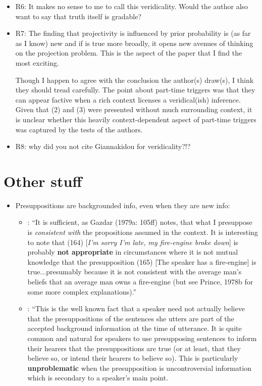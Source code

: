 \documentclass[11pt,fleqn]{article}
\newcommand{\6}{\mbox{$[\hspace*{-.6mm}[$}}
\newcommand{\9}{\mbox{$]\hspace*{-.6mm}]$}}
\begin{document}
{\begin{itemize}
\item R6:  It makes no sense to me to call this veridicality.  Would the author also want to say that truth itself is gradable? 

\item R7: The finding that projectivity is influenced by prior probability is (as far as I know) new and if is true more broadly, it opens new avenues of thinking on the projection problem. This is the aspect of the paper that I find the most exciting.

Though I happen to agree with the conclusion the author(s) draw(s), I think they should tread carefully. The point about part-time triggers was that they can appear factive when a rich context licenses a veridical(ish) inference. Given that (2) and (3) were presented without much surrounding context, it is unclear whether this heavily context-dependent aspect of part-time triggers was captured by the tests of the authors.

\item R8: why did you not cite Giannakidou for veridicality?!?

\end{itemize}

\section{Other stuff}


\begin{itemize}

\item Presuppositions are backgrounded info, even when they are new info:

\begin{itemize}

\item \citealt[205]{levinson83}: ``It is sufficient, as Gazdar (1979a: 105ff) notes, that what I presuppose is {\em consistent with} the propositions assumed in the context. It is interesting to note that (164) [{\em I'm sorry I'm late, my fire-engine broke down}] is probably {\bf not appropriate} in circumstances where it is not mutual knowledge that the presupposition (165) [The speaker has a fire-engine] is true...presumably because it is not consistent with the average man's beliefs that an average man owns a fire-engine (but see Prince, 1978b for some more complex explanations).''

\item \citealt[252]{simons2003}: ``This is the well known fact that a speaker need not actually believe that the presuppositions of the sentences she utters are part of the accepted background information at the time of utterance. It is quite common and natural for speakers to use presupposing sentences to inform their hearers that the presuppositions are true (or at least, that they believe so, or intend their hearers to believe so). This is particularly {\bf unproblematic} when the presupposition is uncontroversial information which is secondary to a speaker’s main point.



\end{itemize}
\end{itemize}}
\end{document}
